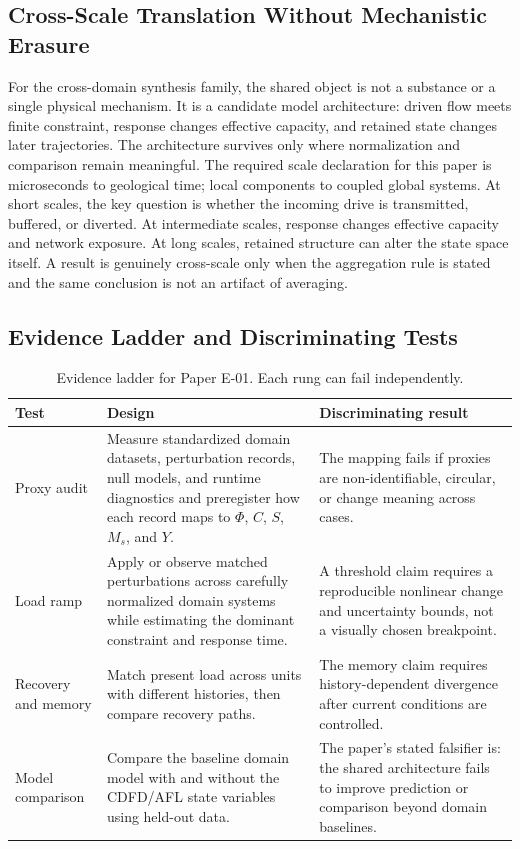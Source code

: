 \documentclass[12pt,a4paper]{article}
\begin{document}
\subsection{Cross-Scale Translation Without Mechanistic Erasure}

For the cross-domain synthesis family, the shared object is not a substance or a single physical mechanism. It is a candidate model architecture: driven flow meets finite constraint, response changes effective capacity, and retained state changes later trajectories. The architecture survives only where normalization and comparison remain meaningful. \cite{BarabasiAlbert1999,WattsStrogatz1998,Holling1973,Turing1952,Shannon1948,BakTangWiesenfeld1987}
The required scale declaration for this paper is microseconds to geological time; local components to coupled global systems. At short
scales, the key question is whether the incoming drive is transmitted,
buffered, or diverted. At intermediate scales, response changes effective
capacity and network exposure. At long scales, retained structure can alter the
state space itself. A result is genuinely cross-scale only when the aggregation
rule is stated and the same conclusion is not an artifact of averaging.

\subsection{Evidence Ladder and Discriminating Tests}

\begin{table}[htbp]
\centering
\small
\caption{Evidence ladder for Paper E-01. Each rung can fail independently.}
\begin{tabularx}{\textwidth}{|p{}|X|X|}
\hline
\textbf{Test} & \textbf{Design} & \textbf{Discriminating result} \\
\hline
Proxy audit & Measure standardized domain datasets, perturbation records, null models, and runtime diagnostics and preregister how each record maps to $\Phi$, $C$, $S$, $M_s$, and $Y$. & The mapping fails if proxies are non-identifiable, circular, or change meaning across cases. \\
\hline
Load ramp & Apply or observe matched perturbations across carefully normalized domain systems while estimating the dominant constraint and response time. & A threshold claim requires a reproducible nonlinear change and uncertainty bounds, not a visually chosen breakpoint. \\
\hline
Recovery and memory & Match present load across units with different histories, then compare recovery paths. & The memory claim requires history-dependent divergence after current conditions are controlled. \\
\hline
Model comparison & Compare the baseline domain model with and without the CDFD/AFL state variables using held-out data. & The paper's stated falsifier is: the shared architecture fails to improve prediction or comparison beyond domain baselines. \\
\hline
\end{tabularx}
\end{table}
\end{document}
